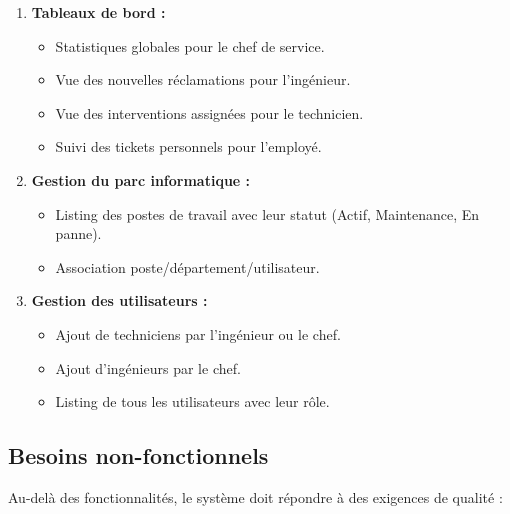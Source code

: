 \documentclass[12pt,a4paper,twoside]{report}
\begin{document}
\begin{enumerate}
    \item \textbf{Tableaux de bord :}
    \begin{itemize}
        \item Statistiques globales pour le chef de service.
        \item Vue des nouvelles réclamations pour l'ingénieur.
        \item Vue des interventions assignées pour le technicien.
        \item Suivi des tickets personnels pour l'employé.
    \end{itemize}
    
    \item \textbf{Gestion du parc informatique :}
    \begin{itemize}
        \item Listing des postes de travail avec leur statut (Actif, Maintenance, En panne).
        \item Association poste/département/utilisateur.
    \end{itemize}
    
    \item \textbf{Gestion des utilisateurs :}
    \begin{itemize}
        \item Ajout de techniciens par l'ingénieur ou le chef.
        \item Ajout d'ingénieurs par le chef.
        \item Listing de tous les utilisateurs avec leur rôle.
    \end{itemize}
\end{enumerate}

\subsection{Besoins non-fonctionnels}

Au-delà des fonctionnalités, le système doit répondre à des exigences de qualité :
\end{document}
